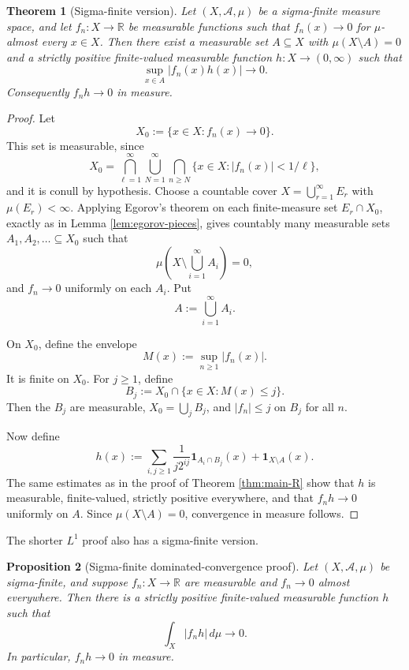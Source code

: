 \documentclass[11pt]{article}
\newcommand{\R}{\mathbb{R}}
\newcommand{\one}{\mathbf 1}
\newcommand{\mc}[1]{\mathcal{#1}}
\theoremstyle{plain}
\newtheorem{theorem}{Theorem}[section]
\newtheorem{proposition}[theorem]{Proposition}
\theoremstyle{definition}
\theoremstyle{remark}
\begin{document}
\begin{theorem}[Sigma-finite version]\label{thm:sigma-finite}
Let $(X,\mc A,\mu)$ be a sigma-finite measure space, and let
$f_n:X\to\R$ be measurable functions such that $f_n(x)\to 0$ for
$\mu$-almost every $x\in X$.  Then there exist a measurable set $A\subseteq X$
with $\mu(X\setminus A)=0$ and a strictly positive finite-valued measurable
function $h:X\to(0,\infty)$ such that
\[
        \sup_{x\in A}|f_n(x)h(x)|\longrightarrow 0.
\]
Consequently $f_nh\to 0$ in measure.
\end{theorem}

\begin{proof}
Let
\[
        X_0:=\{x\in X:f_n(x)\to 0\}.
\]
This set is measurable, since
\[
        X_0=
        \bigcap_{\ell=1}^\infty
        \bigcup_{N=1}^\infty
        \bigcap_{n\geq N}\{x\in X:|f_n(x)|<1/\ell\},
\]
and it is conull by hypothesis.  Choose a countable cover
$X=\bigcup_{r=1}^\infty E_r$ with $\mu(E_r)<\infty$.  Applying Egorov's
theorem on each finite-measure set $E_r\cap X_0$, exactly as in
Lemma \ref{lem:egorov-pieces}, gives countably many measurable sets
$A_1,A_2,\dots\subseteq X_0$ such that
\[
        \mu\left(X\setminus \bigcup_{i=1}^\infty A_i\right)=0,
\]
and $f_n\to 0$ uniformly on each $A_i$.  Put
\[
        A:=\bigcup_{i=1}^\infty A_i.
\]

On $X_0$, define the envelope
\[
        M(x):=\sup_{n\geq 1}|f_n(x)|.
\]
It is finite on $X_0$.  For $j\geq 1$, define
\[
        B_j:=X_0\cap\{x\in X:M(x)\leq j\}.
\]
Then the $B_j$ are measurable, $X_0=\bigcup_j B_j$, and
$|f_n|\leq j$ on $B_j$ for all $n$.

Now define
\[
        h(x)
        :=
        \sum_{i,j\geq 1}\frac{1}{j2^{ij}}\one_{A_i\cap B_j}(x)
        +\one_{X\setminus A}(x).
\]
The same estimates as in the proof of Theorem \ref{thm:main-R} show that
$h$ is measurable, finite-valued, strictly positive everywhere, and that
$f_nh\to 0$ uniformly on $A$.  Since $\mu(X\setminus A)=0$, convergence in
measure follows.
\end{proof}

The shorter $L^1$ proof also has a sigma-finite version.

\begin{proposition}[Sigma-finite dominated-convergence proof]\label{prop:l1-sigma-finite}
Let $(X,\mc A,\mu)$ be sigma-finite, and suppose $f_n:X\to\R$ are measurable
and $f_n\to 0$ almost everywhere.  Then there is a strictly positive
finite-valued measurable function $h$ such that
\[
        \int_X |f_nh|\,d\mu\longrightarrow 0.
\]
In particular, $f_nh\to 0$ in measure.
\end{proposition}
\end{document}
